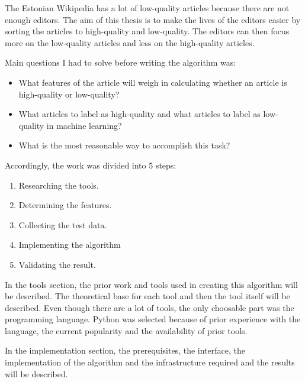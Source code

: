 The Estonian Wikipedia has a lot of low-quality articles because
there are not enough editors. The aim of this thesis is to make the lives of the
editors easier by sorting the articles to high-quality and low-quality. The
editors can then focus more on the low-quality articles and less on the
high-quality articles.

Main questions I had to solve before writing the algorithm was:
\begin{itemize}
  \item What features of the article will weigh in calculating whether
  an article is high-quality or low-quality?
  \item What articles to label as high-quality and what articles to label as
  low-quality in machine learning?
  \item What is the most reasonable way to accomplish this task?
\end{itemize}

Accordingly, the work was divided into 5 steps:
\begin{enumerate}
  \item Researching the tools.
  \item Determining the features.
  \item Collecting the test data.
  \item Implementing the algorithm
  \item Validating the result.
\end{enumerate}

In the tools section, the prior work and tools used in creating this algorithm
will be described. The theoretical base for each tool and then the tool itself
will be described. Even though there are a lot of tools, the only choosable part
was the programming language. Python was selected because of prior experience
with the language, the current popularity and the availability of prior tools.

In the implementation section, the prerequisites, the interface, the
implementation of the algorithm and the infrastructure required and the
results will be described.
